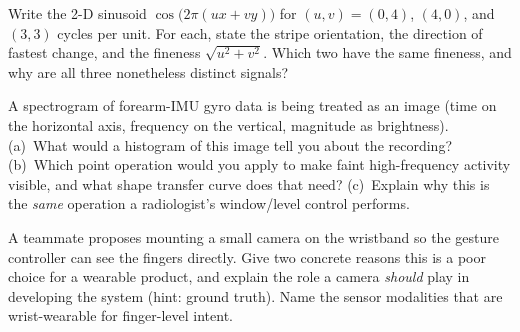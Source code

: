\begin{exercise}
\label{ch30:ex-orientation}
Write the 2-D sinusoid $\cos\!\big(2\pi(u x+v y)\big)$ for $(u,v)=(0,4)$,
$(4,0)$, and $(3,3)$ cycles per unit. For each, state the stripe orientation, the
direction of fastest change, and the fineness $\sqrt{u^2+v^2}$. Which two have the
same fineness, and why are all three nonetheless distinct signals?
\end{exercise}

\begin{exercise}
\label{ch30:ex-spectrogram}
A spectrogram of forearm-IMU gyro data is being treated as an image (time on the
horizontal axis, frequency on the vertical, magnitude as brightness). (a)~What
would a histogram of this image tell you about the recording? (b)~Which point
operation would you apply to make faint high-frequency activity visible, and what
shape transfer curve does that need? (c)~Explain why this is the \emph{same}
operation a radiologist's window/level control performs.
\end{exercise}

\begin{exercise}
\label{ch30:ex-camera}
A teammate proposes mounting a small camera on the wristband so the gesture
controller can see the fingers directly. Give two concrete reasons this is a poor
choice for a wearable product, and explain the role a camera \emph{should} play in
developing the system (hint: ground truth). Name the sensor modalities that are
wrist-wearable for finger-level intent.
\end{exercise}
